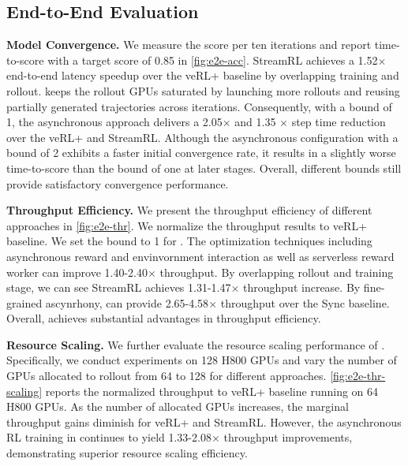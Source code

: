 \subsection{End-to-End Evaluation}
\label{ssec:e2e-performance}


\noindent\textbf{Model Convergence.} We measure the score per ten iterations and report time-to-score with a target score of 0.85 in \autoref{fig:e2e-acc}. StreamRL achieves a 1.52\(\times\) end-to-end latency speedup over the veRL+ baseline by overlapping training and rollout. \SystemName{} keeps the rollout GPUs saturated by launching more rollouts and reusing partially generated trajectories across iterations. Consequently, with a bound of 1, the asynchronous approach delivers a 2.05\(\times\) and 1.35 \(\times\) step time reduction over the veRL+ and StreamRL. Although the asynchronous configuration with a bound of 2 exhibits a faster initial convergence rate, it results in a slightly worse time-to-score than the bound of one at later stages. Overall, different bounds still provide satisfactory convergence performance.

\noindent\textbf{Throughput Efficiency.} We present the throughput efficiency of different approaches in \autoref{fig:e2e-thr}. We normalize the throughput results to veRL+ baseline. We set the bound to 1 for \SystemName{}. The optimization techniques including asynchronous reward and envinvornment interaction as well as serverless reward worker can improve 1.40-2.40\(\times\) throughput. By overlapping rollout and training stage, we can see StreamRL achieves 1.31-1.47\(\times\) throughput increase. By fine-grained ascynrhony, \SystemName{} can provide 2.65-4.58\(\times\) throughput over the Sync baseline. Overall, \SystemName{} achieves substantial advantages in throughput efficiency.



\noindent\textbf{Resource Scaling.} We further evaluate the resource scaling performance of \SystemName{}. Specifically, we conduct experiments on 128 H800 GPUs and vary the number of GPUs allocated to rollout from 64 to 128 for different approaches. \autoref{fig:e2e-thr-scaling} reports the normalized throughput to veRL+ baseline running on 64 H800 GPUs. As the number of allocated GPUs increases, the marginal throughput gains diminish for veRL+ and StreamRL. However, the asynchronous RL training in \SystemName{} continues to yield 1.33-2.08\(\times\) throughput improvements, demonstrating superior resource scaling efficiency. 



